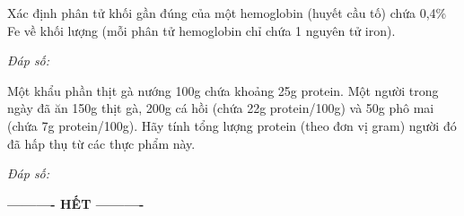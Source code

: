\documentclass[11pt,a4paper]{article}
\def\loigiai#1{}
\begin{document}
\begin{ex}
Xác định phân tử khối gần đúng của một hemoglobin (huyết cầu tố) chứa 0,4\% Fe về khối lượng (mỗi phân tử hemoglobin chỉ chứa 1 nguyên tử iron).
\loigiai{}
\end{ex}
\noindent\textit{Đáp số:} \dotfill\vspace{0.25cm}

\begin{ex}
Một khẩu phần thịt gà nướng 100g chứa khoảng 25g protein. Một người trong ngày đã ăn 150g thịt gà, 200g cá hồi (chứa 22g protein/100g) và 50g phô mai (chứa 7g protein/100g). Hãy tính tổng lượng protein (theo đơn vị gram) người đó đã hấp thụ từ các thực phẩm này.
\loigiai{}
\end{ex}
\noindent\textit{Đáp số:} \dotfill\vspace{0.25cm}

\vspace{0.1cm}
\begin{center}
	\textbf{---------- HẾT ----------}
\end{center}
\end{document}
